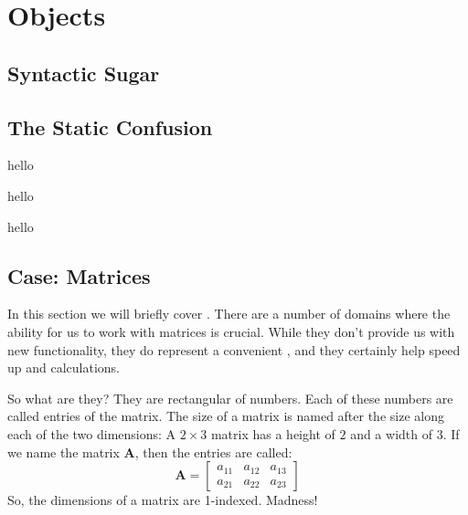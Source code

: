 \chapter{Objects}




\section{Syntactic Sugar}



\section{The Static Confusion}



\csharpsection{\csharp}
hello

hello

hello

\section{Case: Matrices}

In this section we will briefly cover . There are a number of domains where the ability for us to work with matrices is crucial. While they don't provide us with new functionality, they do represent a convenient , and they certainly help speed up  and  calculations.

So what are they? They are rectangular  of numbers. Each of these numbers are called entries of the matrix. The size of a matrix is named after the size along each of the two dimensions: A $2 \times 3$ matrix has a height of $2$ and a width of $3$. If we name the matrix $\mathbf{A}$, then the entries are called:
\begin{equation*}
  \mathbf{A} =
  \left[
    \begin{matrix}
      a_{11} & a_{12} & a_{13} \\
      a_{21} & a_{22} & a_{23}
    \end{matrix}
  \right]
\end{equation*}
So, the dimensions of a matrix are 1-indexed. Madness!

